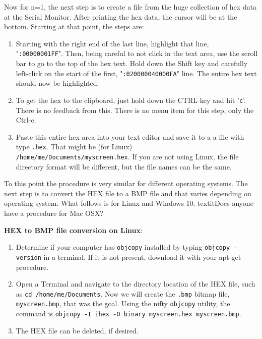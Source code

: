 \begin{description}
Now for n=1, the next step is to create a file from the huge collection of hex data at the Serial Monitor.  After printing the hex data, the cursor will be at the bottom.  Starting at that point, the steps are:
\begin{enumerate}

\item Starting with the right end of the last line, highlight that line, "\texttt{:00000001FF}". Then, being careful to not click in the text area, use the scroll bar to go to the top of the hex text. Hold down the Shift key and carefully left-click on the start of the first, "\texttt{:020000040000FA}" line. The entire hex text should now be highlighted.

\item To get the hex to the clipboard, just hold down the CTRL key and hit '\texttt{c}'. There is no feedback from this. There is no menu item for this step, only the Ctrl-c.

\item Paste this entire hex area into your text editor and save it to a a file with type \texttt{.hex}. That might be (for Linux) \\ \texttt{/home/me/Documents/myscreen.hex}.  If you are not using Linux, the file directory format will be different, but the file names can be the same.
\end{enumerate}

To this point the procedure is very similar for different operating systems.  The next step is to convert the HEX file to a BMP file and that varies depending on operating system.   What follows is for Linux and Windows 10.  textit{Does anyone have a procedure for Mac OSX?}  


\textbf{HEX to BMP file conversion on Linux}:
\begin{enumerate}
\item Determine if your computer has \texttt{objcopy} installed by typing \texttt{objcopy -version} in a terminal.  If it is not present, download it with your apt-get procedure.

\item Open a Terminal and navigate to the directory location of the HEX file, such as \texttt{cd /home/me/Documents}.  Now we will create the \texttt{.bmp} bitmap file, \texttt{myscreen.bmp}, that was the goal.  Using the nifty \texttt{objcopy} utility, the command is \texttt{objcopy -I ihex -O binary myscreen.hex myscreen.bmp}.

\item The HEX file can be deleted, if desired.
\end{enumerate}


\end{description}
